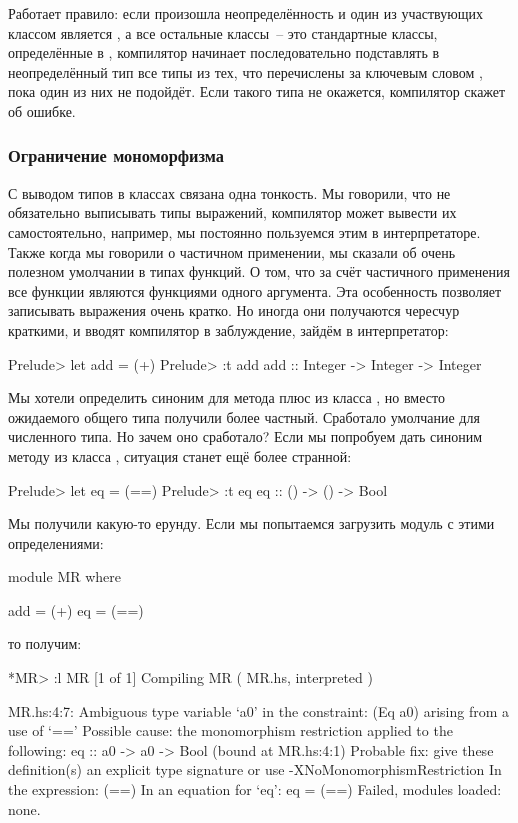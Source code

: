Работает правило: если произошла неопределённость и один 
из участвующих классом является , а все остальные
классы~-- это стандартные классы, определённые в ,
компилятор начинает последовательно подставлять в неопределённый
тип все типы из тех, что перечислены за ключевым словом ,
пока один из них не подойдёт. Если такого типа не окажется, 
компилятор скажет об ошибке. 

\subsubsection{Ограничение мономорфизма}

С выводом типов в классах связана одна тонкость. 
Мы говорили, что не обязательно выписывать типы выражений,
компилятор может вывести их самостоятельно, например, 
мы постоянно пользуемся этим в интерпретаторе.
Также когда мы говорили о частичном применении,
мы сказали об очень полезном умолчании в типах функций.
О том, что за счёт частичного применения все функции 
являются функциями одного аргумента. Эта особенность
позволяет записывать выражения очень кратко. Но иногда
они получаются чересчур краткими, и вводят компилятор
в заблуждение, зайдём в интерпретатор:

\begin{code}
Prelude> let add = (+)
Prelude> :t add
add :: Integer -> Integer -> Integer
\end{code}

Мы хотели определить синоним для метода плюс из класса ,
но вместо ожидаемого общего типа получили более частный. 
Сработало умолчание для численного типа. Но зачем оно сработало?
Если мы попробуем дать синоним методу из класса ,
ситуация станет ещё более странной:

\begin{code}
Prelude> let eq = (==)
Prelude> :t eq
eq :: () -> () -> Bool
\end{code}

Мы получили какую-то ерунду. Если мы попытаемся загрузить 
модуль с этими определениями:

\begin{code}
module MR where

add = (+)
eq  = (==)
\end{code}

\noindent то получим:

\begin{code}
*MR> :l MR
[1 of 1] Compiling MR               ( MR.hs, interpreted )

MR.hs:4:7:
    Ambiguous type variable `a0' in the constraint:
      (Eq a0) arising from a use of `=='
    Possible cause: the monomorphism restriction applied to the following:
      eq :: a0 -> a0 -> Bool (bound at MR.hs:4:1)
    Probable fix: give these definition(s) an explicit type signature
                  or use -XNoMonomorphismRestriction
    In the expression: (==)
    In an equation for `eq': eq = (==)
Failed, modules loaded: none.
\end{code}

